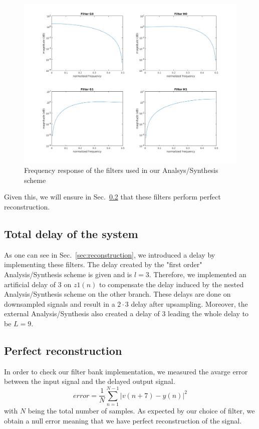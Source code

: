 \documentclass[a4paper,twocolumn]{article}
\begin{document}
\begin{figure}[!ht]
  \begin{center}
    \includegraphics[width=1.1\columnwidth]{filters2.png}
  \end{center}
  \caption{Frequency response of the filters used in our Analsys/Synthesis scheme}
  \label{fig:filters}
\end{figure}


Given this, we will ensure in Sec.~\ref{sec:numreconstruction} that these filters perform perfect reconstruction.


\subsection{Total delay of the system}
As one can see in Sec.~\ref{sec:reconstruction}, we introduced a delay by implementing these filters. The delay created by the "first order" Analysis/Synthesis scheme is given and is $l=3$. Therefore, we implemented an artificial delay of $3$ on $z{1}(n)$ to compensate the delay induced by the nested Analysis/Synthesis scheme on the other branch. These delays are done on downsampled signals and result in a $2 \cdot 3$ delay after upsampling. Moreover, the external Analysis/Synthesis also created a delay of 3 leading the whole delay to be $L=9$.

\subsection{Perfect reconstruction}
\label{sec:numreconstruction}
In order to check our filter bank implementation, we measured the avarge error between the input signal and the delayed output signal.
\begin{equation}
error=\frac{1}{N}\sum_{n=1}^{N-1}|v(n+7)-y(n)|^{2}
\end{equation}
with $N$ being the total number of samples. As expected by our choice of filter, we obtain a null error meaning that we have perfect reconstruction of the signal.
\end{document}
